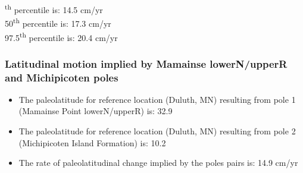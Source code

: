 \documentclass{article}
\begin{document}
    \begin{center}
    \end{center}
    
    \begin{figure}[h]
    \centering
    \end{figure}
    
\textsuperscript{th} percentile is: 14.5 cm/yr\\
50\textsuperscript{th} percentile is: 17.3 cm/yr\\
97.5\textsuperscript{th} percentile is: 20.4 cm/yr\\


\newpage

\subsubsection{Latitudinal motion implied by Mamainse lowerN/upperR and Michipicoten poles}\label{MamainseMichipicotenRate}

\begin{itemize}
\item{The paleolatitude for reference location (Duluth, MN) resulting from pole 1 (Mamainse Point lowerN/upperR) is: 32.9\textdegree}
\item{The paleolatitude for reference location (Duluth, MN) resulting from pole 2 (Michipicoten Island Formation) is: 10.2\textdegree}
\item{The rate of paleolatitudinal change implied by the poles pairs is: 14.9 cm/yr}
\end{itemize}

    \begin{center}
    \end{center}
    
    \begin{figure}[h]
    \centering
    \end{figure}
    
\end{document}
